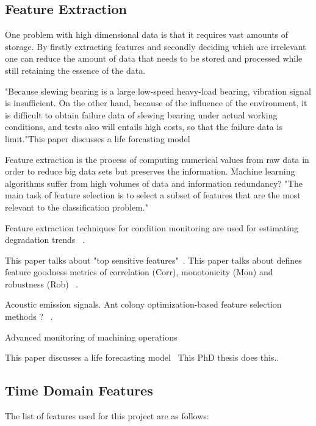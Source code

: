 \documentclass[]{article}
\begin{document}
\subsection{Feature Extraction}

One problem with high dimensional data is that it requires vast amounts of storage. By firstly extracting features and secondly deciding which are irrelevant one can reduce the amount of data that needs to be stored and processed while still retaining the essence of the data.

"Because slewing bearing is a large low-speed heavy-load bearing, vibration signal is insufficient. On the other hand, because of the influence of the
environment, it is difficult to obtain failure data of slewing bearing under actual working conditions, and tests also will entails high costs, so that the failure data is limit."This paper discusses a life forcasting model~\cite{wang2016multiple}

Feature extraction is the process of computing numerical values from raw data in order to reduce big data sets but preserves the information. Machine learning algorithms suffer from high volumes of data and information redundancy?
"The main task of feature selection is to select a subset of features that are the most relevant to the classification problem." ~\cite{ahmed2020condition}

Feature extraction techniques for condition monitoring are used for estimating degradation trends ~\cite{caesarendra2017review,adams2017comparison,hong2014condition}.

This paper talks about "top sensitive features"~\cite{bleakie2013feature}.
This paper talks about defines feature goodness metrics of correlation (Corr), monotonicity (Mon) and robustness (Rob) ~\cite{zhang2016degradation}.

Acoustic emission signals. Ant colony optimization-based feature selection methods ? ~\cite{liao2010feature}.

Advanced monitoring of machining operations~\cite{teti2010advanced}

This paper discusses a life forecasting model~\cite{wang2016multiple}
This PhD thesis does this..~\cite{martin2017unsupervised}

\subsection{Time Domain Features} 	
The list of features used for this project are as follows:
\end{document}
